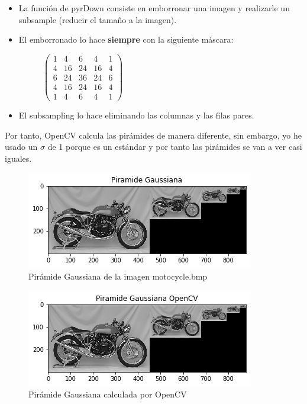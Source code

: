 \documentclass[12pt,spanish]{article}
\begin{document}
\begin{itemize}
	\item La función de pyrDown consiste en emborronar una imagen y realizarle un subsample (reducir el tamaño a la imagen).
	\item El emborronado lo hace \textbf{siempre} con la siguiente máscara:
		\begin{figure}[H]
			\centering
			$\begin{pmatrix}
				1 & 4 & 6 & 4 & 1\\
				4 & 16 & 24 & 16 & 4  \\
				6 & 24 & 36 & 24 & 6 \\
				4 & 16 & 24 & 16 & 4 \\
				1 & 4 & 6 & 4 & 1
			\end{pmatrix}$
		\end{figure}
	\item El subsampling lo hace eliminando las columnas y las filas pares.
\end{itemize}

Por tanto, OpenCV calcula las pirámides de manera diferente, sin embargo, yo he usado un $\sigma$ de 1 porque es un estándar y por tanto las pirámides se van a ver casi iguales.

\begin{figure}[H]
\includegraphics[width=\textwidth]{./imagenes_memoria/pir_gauss.png}
	\caption{Pirámide Gaussiana de la imagen motocycle.bmp}
	\label{pir_gauss}
\end{figure}

\begin{figure}[H]
\includegraphics[width=\textwidth]{./imagenes_memoria/pir_gaussCV.png}
	\caption{Pirámide Gaussiana calculada por OpenCV}
	\label{pir_gaussCV}
\end{figure}
\end{document}
